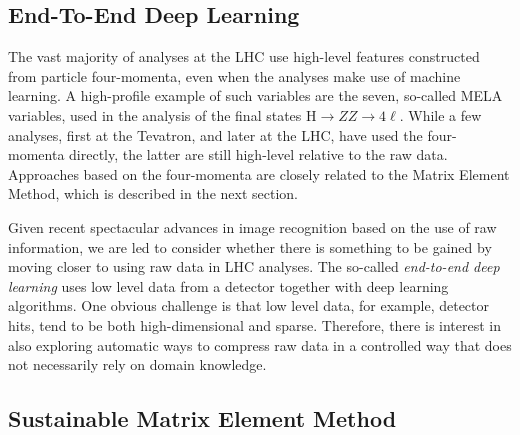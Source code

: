 \subsection{End-To-End Deep Learning}\label{subsec:endtoend}
\label{sec:applications-e2e}
The vast majority of analyses at the LHC use high-level features constructed from particle four-momenta, even when the analyses make use of machine learning. A high-profile example of such variables are the seven, so-called MELA variables, used in the analysis of the final states $\textrm{H} \rightarrow ZZ \rightarrow 4\ell$. While a few analyses, first at the Tevatron, and later at the LHC, have used the four-momenta directly, the latter are still high-level relative to the raw data. Approaches based on the four-momenta are closely related to the Matrix Element Method, which is described in the next section.

Given recent spectacular advances in image recognition based on the use of raw information, we are led to consider whether there is something to be gained by moving closer to using raw data in LHC analyses. The so-called \emph{end-to-end deep learning} uses low level data from a detector together with deep learning algorithms. One obvious challenge is that low level data, for example, detector hits, tend to be both high-dimensional and sparse.
Therefore, there is interest in also exploring automatic ways to compress raw data in a controlled way that does not necessarily rely on domain knowledge.


\subsection{Sustainable Matrix Element Method}
\label{sec:applications-MEM}


